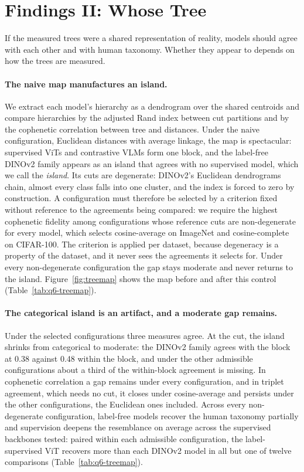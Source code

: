\documentclass{article}
\begin{document}
\section{Findings II: Whose Tree}
\label{sec:content}

If the measured trees were a shared representation of reality, models should agree with each other and with human taxonomy. Whether they appear to depends on how the trees are measured.

\paragraph{The naive map manufactures an island.} We extract each model's hierarchy as a dendrogram over the shared centroids and compare hierarchies by the adjusted Rand index between cut partitions and by the cophenetic correlation between tree and distances. Under the naive configuration, Euclidean distances with average linkage, the map is spectacular: supervised ViTs and contrastive VLMs form one block, and the label-free DINOv2 family appears as an island that agrees with no supervised model, which we call the \emph{island}. Its cuts are degenerate: DINOv2's Euclidean dendrograms chain, almost every class falls into one cluster, and the index is forced to zero by construction. A configuration must therefore be selected by a criterion fixed without reference to the agreements being compared: we require the highest cophenetic fidelity among configurations whose reference cuts are non-degenerate for every model, which selects cosine-average on ImageNet and cosine-complete on CIFAR-100. The criterion is applied per dataset, because degeneracy is a property of the dataset, and it never sees the agreements it selects for. Under every non-degenerate configuration the gap stays moderate and never returns to the island. Figure~\ref{fig:treemap} shows the map before and after this control (Table~\ref{tab:q6-treemap}). %

\paragraph{The categorical island is an artifact, and a moderate gap remains.} Under the selected configurations three measures agree. At the cut, the island shrinks from categorical to moderate: the DINOv2 family agrees with the block at 0.38 against 0.48 within the block, and under the other admissible configurations about a third of the within-block agreement is missing. In cophenetic correlation a gap remains under every configuration, and in triplet agreement, which needs no cut, it closes under cosine-average and persists under the other configurations, the Euclidean ones included. Across every non-degenerate configuration, label-free models recover the human taxonomy partially and supervision deepens the resemblance on average across the supervised backbones tested: paired within each admissible configuration, the label-supervised ViT recovers more than each DINOv2 model in all but one of twelve comparisons (Table~\ref{tab:q6-treemap}). %
\end{document}
